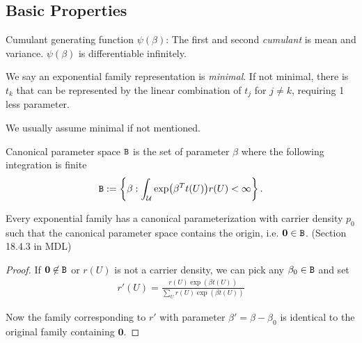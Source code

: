\subsection{Basic Properties}

Cumulant generating function $\psi(\beta)$: The first and second \emph{cumulant} is mean and variance.
$\psi(\beta)$ is differentiable infinitely.

\begin{define}[Minimal]
	We say an exponential family representation is \emph{minimal}.
	If not minimal, there is $t_{k}$ that can be represented
	by the linear combination of $t_{j}$ for $j\not=k$, requiring 1 less parameter.
\end{define}

We usually assume minimal if not mentioned.

\begin{define}
	Canonical parameter space $\mathtt{B}$ is the set of parameter $\beta$
	where the following integration is finite
	\begin{align*}
		\Bt := \left\{\beta: \int_{\Uc} \exp(\beta^T t(U)) r(U) <\infty \right\}.
	\end{align*}

\end{define}

\begin{remark}
	Every exponential family has a canonical parameterization with carrier density $p_0$
	such that the canonical parameter space contains the origin, i.e. $\bm{0} \in \mathtt{B}$.
	(Section 18.4.3 in MDL)
\end{remark}

\begin{proof}
	If $\bm{0} \not\in \mathtt{B}$ or $r(U)$ is not a carrier density, we can pick any $\beta_0 \in \mathtt{B}$
	and set
	\begin{align*}
		r'(U) = \frac{r(U)\exp(\beta t(U))}{\sum_U r(U)\exp(\beta t(U))}
	\end{align*}

	Now the family corresponding to $r'$ with parameter $\beta'=\beta-\beta_0$ is identical
	to the original family containing $\bm{0}$.
\end{proof}

